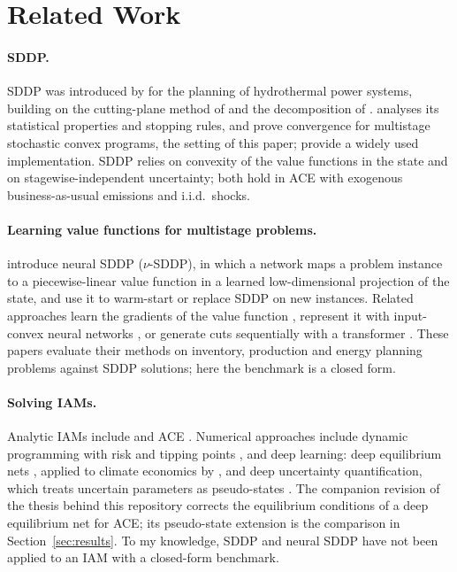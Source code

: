 \section{Related Work}
\label{sec:related}

\paragraph{SDDP.} SDDP was introduced by \textcite{PereiraPinto1991} for the planning of hydrothermal power systems, building on the cutting-plane method of \textcite{Kelley1960} and the decomposition of \textcite{Benders1962}. \textcite{Shapiro2011} analyses its statistical properties and stopping rules, and \textcite{Girardeau2015} prove convergence for multistage stochastic convex programs, the setting of this paper; \textcite{DowsonKapelevich2021} provide a widely used implementation. SDDP relies on convexity of the value functions in the state and on stagewise-independent uncertainty; both hold in ACE with exogenous business-as-usual emissions and i.i.d.\ shocks.

\paragraph{Learning value functions for multistage problems.} \textcite{Dai2022NeuralSDDP} introduce neural SDDP ($\nu$-SDDP), in which a network maps a problem instance to a piecewise-linear value function in a learned low-dimensional projection of the state, and use it to warm-start or replace SDDP on new instances. Related approaches learn the gradients of the value function \parencite{Lee2023VFGL}, represent it with input-convex neural networks \parencite{Bae2023DVFN}, or generate cuts sequentially with a transformer \parencite{Kim2023TranSDDP}. These papers evaluate their methods on inventory, production and energy planning problems against SDDP solutions; here the benchmark is a closed form.

\paragraph{Solving IAMs.} Analytic IAMs include \textcite{Golosov2014} and ACE \parencite{TraegerChristian2023ACE}. Numerical approaches include dynamic programming with risk \parencite{CaiLontzek2019} and tipping points \parencite{LemoineTraeger2014}, and deep learning: deep equilibrium nets \parencite{Azinovic2022DEQN}, applied to climate economics by \textcite{Folini2024ClimateInCE}, and deep uncertainty quantification, which treats uncertain parameters as pseudo-states \parencite{friedl2023_deepUQ}. The companion revision of the thesis behind this repository \parencite{Thieme2025Revised} corrects the equilibrium conditions of a deep equilibrium net for ACE; its pseudo-state extension is the comparison in Section~\ref{sec:results}. To my knowledge, SDDP and neural SDDP have not been applied to an IAM with a closed-form benchmark.
